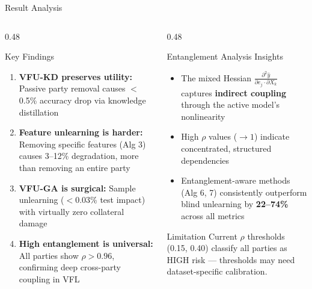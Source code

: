 \documentclass[aspectratio=169, 11pt]{beamer}
\begin{document}
\begin{frame}{Result Analysis}
  \begin{columns}[T]
    \begin{column}{0.48\textwidth}
      \begin{block}{Key Findings}
        \begin{enumerate}
          \item \textbf{VFU-KD preserves utility:} Passive party removal causes $<$0.5\% accuracy drop via knowledge distillation
          \item \textbf{Feature unlearning is harder:} Removing specific features (Alg 3) causes 3--12\% degradation, more than removing an entire party
          \item \textbf{VFU-GA is surgical:} Sample unlearning ($<$0.03\% test impact) with virtually zero collateral damage
          \item \textbf{High entanglement is universal:} All parties show $\rho > 0.96$, confirming deep cross-party coupling in VFL
        \end{enumerate}
      \end{block}
    \end{column}
    \begin{column}{0.48\textwidth}
      \begin{block}{Entanglement Analysis Insights}
        \begin{itemize}
          \item The mixed Hessian $\frac{\partial^2\hat{y}}{\partial e_j \cdot \partial X_k}$ captures \textbf{indirect coupling} through the active model's nonlinearity
          \item High $\rho$ values ($\to 1$) indicate concentrated, structured dependencies
          \item Entanglement-aware methods (Alg 6, 7) consistently outperform blind unlearning by \textbf{22--74\%} across all metrics
        \end{itemize}
      \end{block}
      \vspace{0.2cm}
      \begin{alertblock}{Limitation}
        \footnotesize
        Current $\rho$ thresholds (0.15, 0.40) classify all parties as HIGH risk --- thresholds may need dataset-specific calibration.
      \end{alertblock}
    \end{column}
  \end{columns}
\end{frame}
\end{document}
